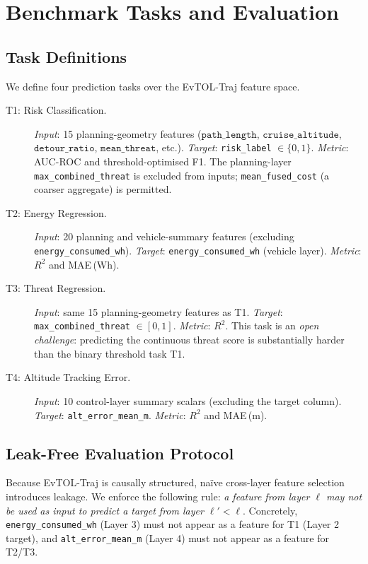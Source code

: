 \documentclass{article}
\theoremstyle{plain}
\theoremstyle{definition}
\begin{document}
\section{Benchmark Tasks and Evaluation}
\label{sec:tasks}

\subsection{Task Definitions}

We define four prediction tasks over the EvTOL-Traj feature space.

\begin{description}
  \item[T1: Risk Classification.]
    \textit{Input}: 15 planning-geometry features
    ($\texttt{path\_length}$, $\texttt{cruise\_altitude}$, $\texttt{detour\_ratio}$,
    $\texttt{mean\_threat}$, etc.).
    \textit{Target}: \texttt{risk\_label} $\in \{0,1\}$.
    \textit{Metric}: AUC-ROC and threshold-optimised F1.
    The planning-layer \texttt{max\_combined\_threat} is excluded from inputs;
    \texttt{mean\_fused\_cost} (a coarser aggregate) is permitted.
  \item[T2: Energy Regression.]
    \textit{Input}: 20 planning and vehicle-summary features
    (excluding \texttt{energy\_consumed\_wh}).
    \textit{Target}: \texttt{energy\_consumed\_wh} (vehicle layer).
    \textit{Metric}: $R^2$ and MAE\,(Wh).
  \item[T3: Threat Regression.]
    \textit{Input}: same 15 planning-geometry features as T1.
    \textit{Target}: \texttt{max\_combined\_threat} $\in [0,1]$.
    \textit{Metric}: $R^2$.
    This task is an \emph{open challenge}: predicting the continuous
    threat score is substantially harder than the binary threshold task T1.
  \item[T4: Altitude Tracking Error.]
    \textit{Input}: 10 control-layer summary scalars
    (excluding the target column).
    \textit{Target}: \texttt{alt\_error\_mean\_m}.
    \textit{Metric}: $R^2$ and MAE\,(m).
\end{description}

\subsection{Leak-Free Evaluation Protocol}

Because EvTOL-Traj is causally structured, na\"{i}ve cross-layer feature
selection introduces leakage.
We enforce the following rule: \emph{a feature from layer $\ell$ may not
be used as input to predict a target from layer $\ell' < \ell$}.
Concretely, \texttt{energy\_consumed\_wh} (Layer 3) must not appear as a
feature for T1 (Layer 2 target), and \texttt{alt\_error\_mean\_m}
(Layer 4) must not appear as a feature for T2/T3.
\end{document}
